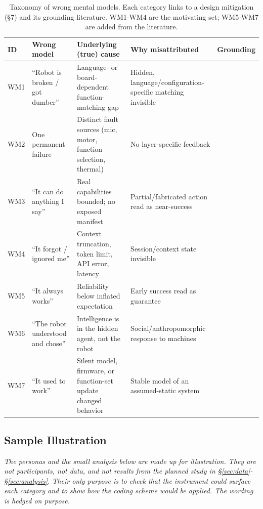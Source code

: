 \documentclass[sigconf]{acmart}
\begin{document}
\begin{table}[t]
  \caption{Taxonomy of wrong mental models. Each category links to a design mitigation (\S7) and its grounding literature. WM1-WM4 are the motivating set; WM5-WM7 are added from the literature.}
  \label{tab:taxonomy}
  \small
  \begin{tabular}{@{}p{0.7cm}p{3.3cm}p{4.0cm}p{4.3cm}p{2.3cm}@{}}
    \toprule
    ID & Wrong model & Underlying (true) cause & Why misattributed & Grounding \\
    \midrule
    WM1 & ``Robot is broken / got dumber'' & Language- or board-dependent function-matching gap & Hidden, language/configuration-specific matching invisible & \cite{joshi2020state} \\
    WM2 & One permanent failure & Distinct fault sources (mic, motor, function selection, thermal) & No layer-specific feedback & \cite{ahn2022saycan, lee2004trust} \\
    WM3 & ``It can do anything I say'' & Real capabilities bounded; no exposed manifest & Partial/fabricated action read as near-success & \cite{ahn2022saycan, amershi2019guidelines} \\
    WM4 & ``It forgot / ignored me'' & Context truncation, token limit, API error, latency & Session/context state invisible & \cite{liu2024lost} \\
    WM5 & ``It always works'' & Reliability below inflated expectation & Early success read as guarantee & \cite{lee2004trust, amershi2019guidelines} \\
    WM6 & ``The robot understood and chose'' & Intelligence is in the hidden agent, not the robot & Social/anthropomorphic response to machines & \cite{nass2000machines, gero2020mental} \\
    WM7 & ``It used to work'' & Silent model, firmware, or function-set update changed behavior & Stable model of an assumed-static system & \cite{devito2017algorithms, amershi2019guidelines} \\
    \bottomrule
  \end{tabular}
\end{table}

\subsection{Sample Illustration}\label{sec:sample}
\emph{The personas and the small analysis below are made up for illustration. They are not participants, not data, and not results from the planned study in \S\ref{sec:data}-\S\ref{sec:analysis}. Their only purpose is to check that the instrument could surface each category and to show how the coding scheme would be applied. The wording is hedged on purpose.}
\end{document}
